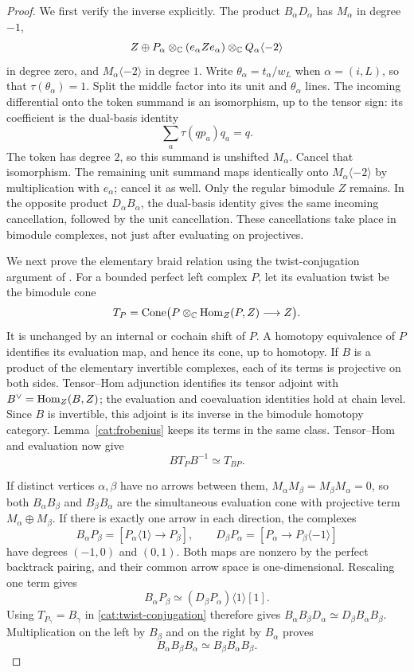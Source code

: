 \begin{proof}
We first verify the inverse explicitly.  The product
$B_\alpha D_\alpha$ has $M_\alpha$ in degree $-1$,
\[
 Z\oplus P_\alpha\otimes_\mathbb C(e_\alpha Ze_\alpha)
                          \otimes_\mathbb C Q_\alpha\langle-2\rangle
\]
in degree zero, and $M_\alpha\langle-2\rangle$ in degree $1$.
Write $\theta_\alpha=t_\alpha/w_L$ when $\alpha=(i,L)$, so that
$\tau(\theta_\alpha)=1$.  Split the middle factor into its unit
and $\theta_\alpha$ lines.  The incoming differential onto the
token summand is an isomorphism, up to the tensor sign: its
coefficient is the dual-basis identity
\[
 \sum_a\tau(qp_a)q_a=q.
\]
The token has degree $2$, so this summand is unshifted
$M_\alpha$.  Cancel that isomorphism.  The remaining unit summand
maps identically onto $M_\alpha\langle-2\rangle$ by multiplication
with $e_\alpha$; cancel it as well.  Only the regular bimodule $Z$
remains.  In the opposite product $D_\alpha B_\alpha$, the
dual-basis identity gives the same incoming cancellation, followed
by the unit cancellation.  These cancellations take place in
bimodule complexes, not just after evaluating on projectives.

We next prove the elementary braid relation using the twist-conjugation
argument of \cite[Lemma~2.11 and Propositions~2.12--2.13]{SeidelThomas2001}.
For a bounded perfect
left complex $P$, let its evaluation twist be the bimodule cone
\[
 T_P=\operatorname{Cone}\bigl(P\otimes_\mathbb C\operatorname{Hom}_Z(P,Z)\longrightarrow Z\bigr).
\]
It is unchanged by an internal or cochain shift of $P$.  A homotopy
equivalence of $P$ identifies its evaluation map, and hence its
cone, up to homotopy.  If $B$ is a product of the elementary
invertible complexes, each of its terms is projective on both
sides.  Tensor--Hom adjunction identifies its tensor adjoint with
$B^\vee=\operatorname{Hom}_Z(B,Z)$; the evaluation and coevaluation identities
hold at chain level.  Since $B$ is invertible, this adjoint is its
inverse in the bimodule homotopy category.  Lemma~\ref{cat:frobenius}
keeps its terms in the same class.  Tensor--Hom and evaluation now
give
\begin{equation}
 B T_P B^{-1}\simeq T_{BP}.
 \label{cat:twist-conjugation}
\end{equation}

If distinct vertices $\alpha,\beta$ have no arrows between them,
$M_\alpha M_\beta=M_\beta M_\alpha=0$, so both
$B_\alpha B_\beta$ and $B_\beta B_\alpha$ are the simultaneous
evaluation cone with projective term $M_\alpha\oplus M_\beta$.
If there is exactly one arrow in each direction, the complexes
\[
 B_\alpha P_\beta
  =[P_\alpha\langle1\rangle\longrightarrow P_\beta],
 \qquad
 D_\beta P_\alpha
  =[P_\alpha\longrightarrow P_\beta\langle-1\rangle]
\]
have degrees $(-1,0)$ and $(0,1)$.  Both maps are nonzero by the
perfect backtrack pairing, and their common arrow space is
one-dimensional.  Rescaling one term gives
\[
 B_\alpha P_\beta\simeq
       (D_\beta P_\alpha)\langle1\rangle[1].
\]
Using $T_{P_\gamma}=B_\gamma$ in
\eqref{cat:twist-conjugation} therefore gives
$B_\alpha B_\beta D_\alpha\simeq D_\beta B_\alpha B_\beta$.
Multiplication on the left by $B_\beta$ and on the right by
$B_\alpha$ proves
\[
 B_\alpha B_\beta B_\alpha
       \simeq B_\beta B_\alpha B_\beta.
\]


\end{proof}
